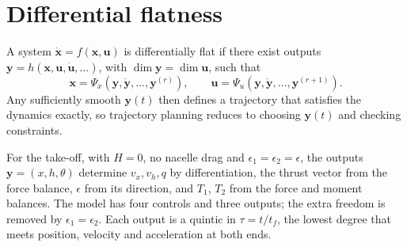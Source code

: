 \documentclass[11pt,a4paper]{article}
\begin{document}
\section{Differential flatness}\label{app:flatness}
A system $\dot{\mathbf{x}} = f(\mathbf{x}, \mathbf{u})$ is differentially flat if there exist outputs
$\mathbf{y} = h(\mathbf{x}, \mathbf{u}, \dot{\mathbf{u}}, \dots)$, with $\dim\mathbf{y} = \dim\mathbf{u}$, such that
\begin{equation}
\mathbf{x} = \Psi_x(\mathbf{y}, \dot{\mathbf{y}}, \dots, \mathbf{y}^{(r)}), \qquad
\mathbf{u} = \Psi_u(\mathbf{y}, \dot{\mathbf{y}}, \dots, \mathbf{y}^{(r+1)}) .
\end{equation}
Any sufficiently smooth $\mathbf{y}(t)$ then defines a trajectory that satisfies the dynamics exactly,
so trajectory planning reduces to choosing $\mathbf{y}(t)$ and checking constraints.

For the take-off, with $H = 0$, no nacelle drag and $\epsilon_1 = \epsilon_2 = \epsilon$, the outputs
$\mathbf{y} = (x, h, \theta)$ determine $v_x, v_h, q$ by differentiation, the thrust vector from the force
balance, $\epsilon$ from its direction, and $T_1$, $T_2$ from the force and moment balances. The model has
four controls and three outputs; the extra freedom is removed by $\epsilon_1 = \epsilon_2$. Each output is
a quintic in $\tau = t/t_f$, the lowest degree that meets position, velocity and acceleration at both
ends.
\end{document}
